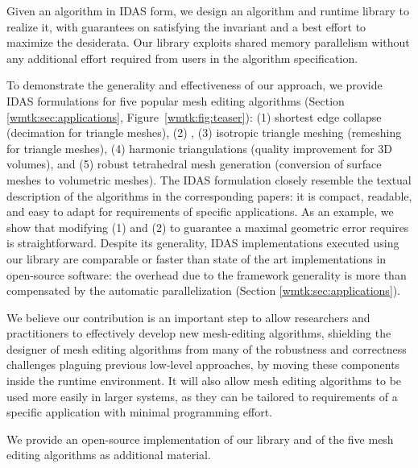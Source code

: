 Given an algorithm in IDAS form, we design an algorithm and runtime library to realize it, with guarantees on satisfying the invariant and a best effort to maximize the desiderata. Our library exploits shared memory parallelism without any additional effort required from users in the algorithm specification. 

To demonstrate the generality and effectiveness of our approach, we provide IDAS formulations for five popular mesh editing algorithms (Section \ref{wmtk:sec:applications}, Figure~\ref{wmtk:fig:teaser}): (1) shortest edge collapse \cite{hoppe1996progressive} (decimation for triangle meshes), (2)  \cite{garland1997surface}, (3) isotropic triangle meshing \cite{botsch2004remeshing} (remeshing for triangle meshes), (4) harmonic triangulations \cite{Alexa:2019} (quality improvement for 3D volumes), and (5) robust tetrahedral mesh generation \cite{Hu:2019:fTetWild} (conversion of surface meshes to volumetric meshes). 
The IDAS formulation closely resemble the textual description of the algorithms in the corresponding papers: it is compact, readable, and easy to adapt for requirements of specific applications. As an example, we show that modifying (1) and (2) to guarantee a maximal geometric error requires is straightforward. Despite its generality, IDAS implementations executed using our library are comparable or faster than state of the art implementations in open-source software: the overhead due to the framework generality is more than compensated by the automatic parallelization (Section \ref{wmtk:sec:applications}).

We believe our contribution is an important step to allow researchers and practitioners to effectively develop new mesh-editing algorithms, shielding the designer of mesh editing algorithms from many of the robustness and correctness challenges plaguing previous low-level approaches, by moving these components inside the runtime environment. It will also allow mesh editing algorithms to be used more easily in larger systems, as they can be tailored to requirements of a specific application with minimal programming effort.

We provide an open-source implementation of our library and of the five mesh editing algorithms as additional material.

